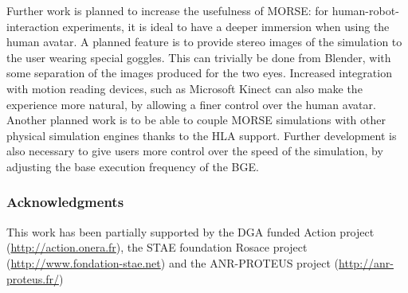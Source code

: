 \documentclass{llncs}
\begin{document}
Further work is planned to increase the usefulness of MORSE:
for human-robot-interaction experiments, it is ideal to have a deeper
immersion when using the human avatar.  A planned feature is to provide stereo
images of the simulation to the user wearing special goggles. This can trivially
be done
from Blender, with some separation of the images produced for the two eyes.
Increased integration with motion reading devices, such as Microsoft Kinect can
also make the experience more natural, by allowing a finer control over the
human avatar.
Another planned work is to be able to couple MORSE simulations with
other physical simulation engines thanks to the HLA support.
Further development is also necessary to give users more control over the speed
of the simulation, by adjusting the base execution frequency of the BGE.

\subsubsection*{Acknowledgments}
This work has been partially supported by the DGA funded Action project
(\url{http://action.onera.fr}), the STAE foundation Rosace project
(\url{http://www.fondation-stae.net}) and the ANR-PROTEUS
project (\url{http://anr-proteus.fr/})


%
% 

\end{document}
